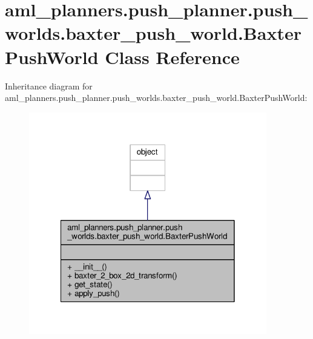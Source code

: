 \hypertarget{classaml__planners_1_1push__planner_1_1push__worlds_1_1baxter__push__world_1_1_baxter_push_world}{\section{aml\-\_\-planners.\-push\-\_\-planner.\-push\-\_\-worlds.\-baxter\-\_\-push\-\_\-world.\-Baxter\-Push\-World Class Reference}
\label{classaml__planners_1_1push__planner_1_1push__worlds_1_1baxter__push__world_1_1_baxter_push_world}
}


Inheritance diagram for aml\-\_\-planners.\-push\-\_\-planner.\-push\-\_\-worlds.\-baxter\-\_\-push\-\_\-world.\-Baxter\-Push\-World\-:\nopagebreak
\begin{figure}[H]
\begin{center}
\leavevmode
\includegraphics[width=294pt]{classaml__planners_1_1push__planner_1_1push__worlds_1_1baxter__push__world_1_1_baxter_push_world__inherit__graph}
\end{center}
\end{figure}


